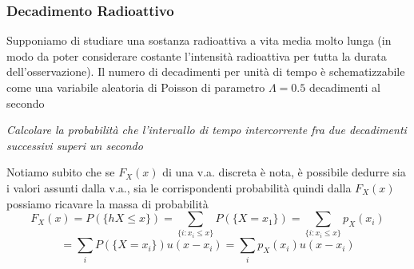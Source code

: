 \documentclass[11pt,a4paper]{article}
\begin{document}
\subsubsection{Decadimento Radioattivo}\label{sec:Decadimento Radioattivo} %
Supponiamo di studiare una sostanza radioattiva a vita media molto lunga
(in modo da poter considerare costante l’intensità radioattiva per tutta la
durata dell’osservazione). Il numero di decadimenti per unità di tempo è schematizzabile come una
variabile aleatoria di Poisson di parametro $\Lambda = 0.5$ decadimenti al secondo
\begin{importantbox}
    \textit{Calcolare la probabilità che l’intervallo di tempo intercorrente fra due
    decadimenti successivi superi un secondo}
\end{importantbox}
Notiamo subito che se  $F_X(x)$ di una v.a. discreta
è nota, è possibile dedurre sia i valori assunti dalla v.a., sia le
corrispondenti probabilità quindi dalla $F_X(x)$ possiamo ricavare la massa di probabilità
\[
    F_X(x) = P(\{hX \leq x\}) = \sum_{\{i: x_i \leq x\}} P(\{X = x_1\}) = \sum_{\{i: x_i \leq x\}} p_X(x_i)
\]
\[
    = \sum_i P(\{X = x_i\})u(x - x_i) = \sum_i p_X(x_i)u(x - x_i)
\]
\end{document}
